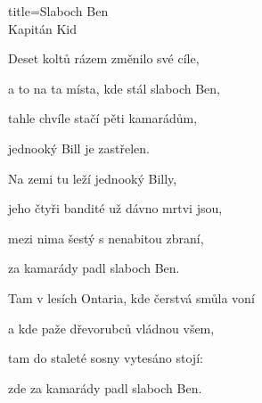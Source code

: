 \begin{song}{title=\predtitle\centering Slaboch Ben \\ Kapitán Kid\large  \vspace*{-0.3cm}}
\begin{centerjustified}
	
\sloka	
	Deset koltů rázem změnilo své cíle,
	
	a to na ta místa, kde stál slaboch Ben,
	
	tahle chvíle stačí pěti kamarádům,
	
	jednooký Bill je zastřelen.

	
\sloka	
	Na zemi tu leží jednooký Billy,
	
	jeho čtyři bandité už dávno mrtvi jsou,
	
	mezi nima šestý s nenabitou zbraní,
	
	za kamarády padl slaboch Ben.

	
\sloka	
	Tam v lesích Ontaria, kde čerstvá smůla voní

	a kde paže dřevorubců vládnou všem,
	
	tam do staleté sosny vytesáno stojí:
	
	zde za kamarády padl slaboch Ben.



\end{centerjustified}
\setcounter{Slokočet}{0}
\end{song}

